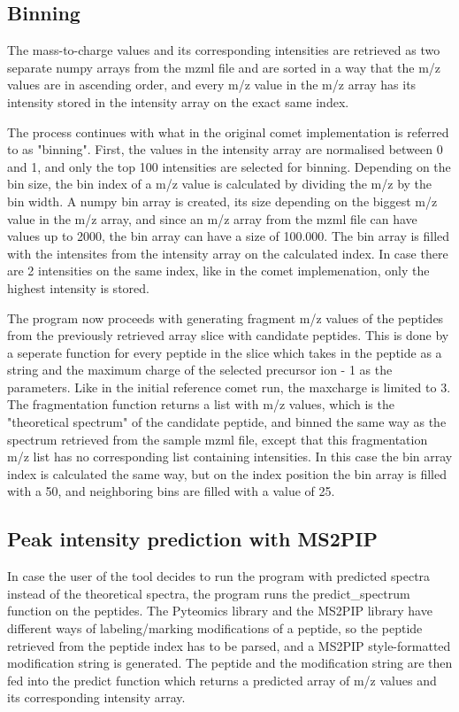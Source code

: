 \documentclass[11pt]{article}
\begin{document}
\subsection{Binning}
The mass-to-charge values and its corresponding intensities are retrieved as two separate numpy arrays from the mzml file and are sorted in a way that the m/z values are in ascending order, and every m/z value in the m/z array has its intensity stored in the intensity array on the exact same index.

The process continues with what in the original comet implementation is referred to as "binning". First, the values in the intensity array are normalised between 0 and 1, and only the top 100 intensities are selected for binning. Depending on the bin size, the bin index of a m/z value is calculated by dividing the m/z by the bin width. A numpy bin array is created, its size depending on the biggest m/z value in the m/z array, and since an m/z array from the mzml file can have values up to 2000, the bin array can have a size of 100.000. The bin array is filled with the intensites from the intensity array on the calculated index. In case there are 2 intensities on the same index, like in the comet implemenation, only the highest intensity is stored.

The program now proceeds with generating fragment m/z values of the peptides from the previously retrieved array slice with candidate peptides. This is done by a seperate function for every peptide in the slice which takes in the peptide as a string and the maximum charge of the selected precursor ion - 1 as the parameters. Like in the initial reference comet run, the maxcharge is limited to 3. The fragmentation function returns a list with m/z values, which is the "theoretical spectrum" of the candidate peptide, and binned the same way as the spectrum retrieved from the sample mzml file, except that this fragmentation m/z list has no corresponding list containing intensities. In this case the bin array index is calculated the same way, but on the index position the bin array is filled with a 50, and neighboring bins are filled with a value of 25. 

\subsection{Peak intensity prediction with MS2PIP}
In case the user of the tool decides to run the program with predicted spectra instead of the theoretical spectra, the program runs the predict\_spectrum function on the peptides. The Pyteomics library and the MS2PIP library have different ways of labeling/marking modifications of a peptide, so the peptide retrieved from the peptide index has to be parsed, and a MS2PIP style-formatted modification string is generated. The peptide and the modification string are then fed into the predict function which returns a predicted array of m/z values and its corresponding intensity array.
\end{document}
